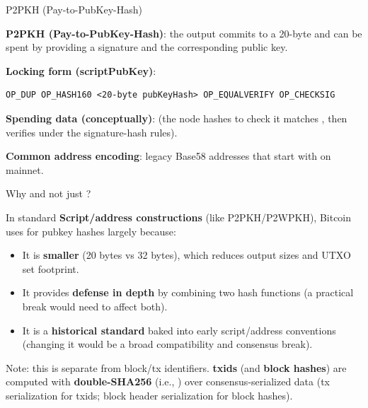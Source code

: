 \begin{deepdive}{P2PKH (Pay-to-PubKey-Hash)}

\textbf{P2PKH (Pay-to-PubKey-Hash)}: the output commits to a 20-byte  and can be spent by providing a signature and the corresponding public key.

\textbf{Locking form (scriptPubKey)}:
\begin{verbatim}
OP_DUP OP_HASH160 <20-byte pubKeyHash> OP_EQUALVERIFY OP_CHECKSIG
\end{verbatim}

\textbf{Spending data (conceptually)}:  (the node hashes  to check it matches , then verifies  under the signature-hash rules).

\textbf{Common address encoding}: legacy Base58 addresses that start with  on mainnet.

\end{deepdive}

\begin{infobox}{Why  and not just ?}

In standard \textbf{Script/address constructions} (like P2PKH/P2WPKH), Bitcoin uses  for pubkey hashes largely because:

\begin{itemize}
  \item It is \textbf{smaller} (20 bytes vs 32 bytes), which reduces output sizes and UTXO set footprint.
  \item It provides \textbf{defense in depth} by combining two hash functions (a practical break would need to affect both).
  \item It is a \textbf{historical standard} baked into early script/address conventions (changing it would be a broad compatibility and consensus break).
\end{itemize}

Note: this is separate from block/tx identifiers. \textbf{txids} (and \textbf{block hashes}) are computed with \textbf{double-SHA256} (i.e., ) over consensus-serialized data (tx serialization for txids; block header serialization for block hashes).

\end{infobox}


